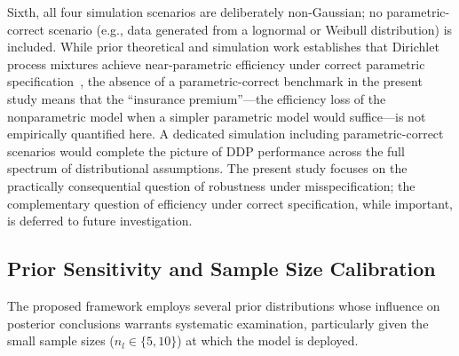 \documentclass[a4paper,fleqn,longmktitle]{cas-sc}
\begin{document}
Sixth, all four simulation scenarios are deliberately non-Gaussian; no parametric-correct scenario (e.g., data generated from a lognormal or Weibull distribution) is included. While prior theoretical and simulation work establishes that Dirichlet process mixtures achieve near-parametric efficiency under correct parametric specification~\cite{Ghosal2000,Ishwaran2001,Quintana2022}, the absence of a parametric-correct benchmark in the present study means that the ``insurance premium''---the efficiency loss of the nonparametric model when a simpler parametric model would suffice---is not empirically quantified here. A dedicated simulation including parametric-correct scenarios would complete the picture of DDP performance across the full spectrum of distributional assumptions. The present study focuses on the practically consequential question of robustness under misspecification; the complementary question of efficiency under correct specification, while important, is deferred to future investigation.

\subsection{Prior Sensitivity and Sample Size Calibration}
\label{sec:sensitivity}

The proposed framework employs several prior distributions whose influence on posterior conclusions warrants systematic examination, particularly given the small sample sizes ($n_l \in \{5, 10\}$) at which the model is deployed.
\end{document}
